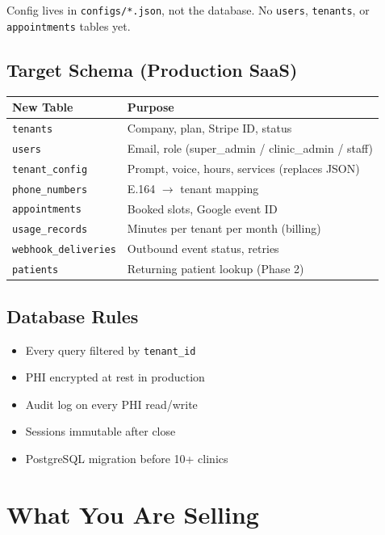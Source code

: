 \documentclass[11pt,a4paper]{article}
\begin{document}
Config lives in \texttt{configs/*.json}, not the database. No \texttt{users}, \texttt{tenants}, or \texttt{appointments} tables yet.

\subsection{Target Schema (Production SaaS)}

\begin{center}
\small
\begin{tabular}{@{}ll@{}}
\toprule
\textbf{New Table} & \textbf{Purpose} \\
\midrule
\texttt{tenants} & Company, plan, Stripe ID, status \\
\texttt{users} & Email, role (super\_admin / clinic\_admin / staff) \\
\texttt{tenant\_config} & Prompt, voice, hours, services (replaces JSON) \\
\texttt{phone\_numbers} & E.164 $\rightarrow$ tenant mapping \\
\texttt{appointments} & Booked slots, Google event ID \\
\texttt{usage\_records} & Minutes per tenant per month (billing) \\
\texttt{webhook\_deliveries} & Outbound event status, retries \\
\texttt{patients} & Returning patient lookup (Phase 2) \\
\bottomrule
\end{tabular}
\end{center}

\subsection{Database Rules}
\begin{itemize}[nosep]
  \item Every query filtered by \texttt{tenant\_id}
  \item PHI encrypted at rest in production
  \item Audit log on every PHI read/write
  \item Sessions immutable after close
  \item PostgreSQL migration before 10+ clinics
\end{itemize}

\section{What You Are Selling}
\end{document}
